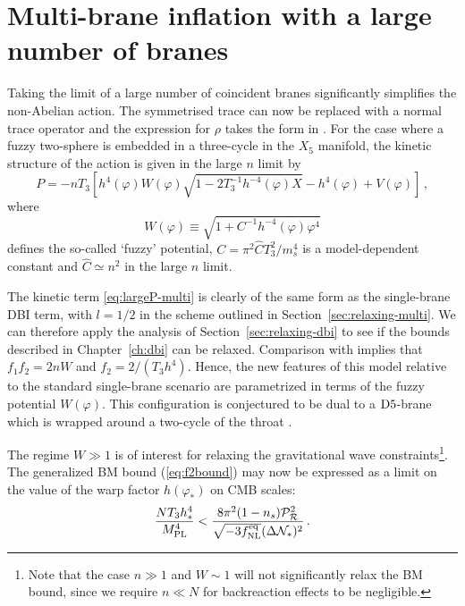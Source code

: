\section{Multi-brane inflation with a large number of branes}
\label{sec:twlargen-multi}
Taking the limit of a large number of coincident branes significantly
simplifies the non-Abelian action. The symmetrised trace can
now be replaced with a normal trace operator and the expression for $\rho$
takes the form in . 
% 
 For the case where a fuzzy two-sphere is 
embedded in a three-cycle in the $X_5$ manifold, 
the kinetic structure of the action is given in the large $n$ limit by 
\cite{thomasward}
% 
\begin{equation}
\label{eq:largeP-multi}
P=-nT_3 \left[ h^4(\varphi ) W(\varphi ) 
\sqrt{1-2 T_3^{-1} h^{-4}(\varphi) X}
-h^4(\varphi ) + V (\varphi ) \right] \,,
\end{equation}
% 
where
%    
\begin{equation} 
\label{eq:defW}
W (\varphi ) \equiv \sqrt{1+ C^{-1}h^{-4}(\varphi ) \varphi^4}
\end{equation}
% 
defines the so-called `fuzzy' potential, 
$C = \pi^2 \hat{C}T_3^2/m_s^4$ is a model-dependent constant and 
$\hat{C} \simeq n^2$ in the large $n$ limit. 

The kinetic term \eqref{eq:largeP-multi} is clearly of the same form as the
single-brane DBI term, with $l=1/2$ in the scheme outlined in
Section~\ref{sec:relaxing-multi}. We can therefore apply the analysis of
Section~\ref{sec:relaxing-dbi} to see if the bounds described in
Chapter~\ref{ch:dbi} can be relaxed.
Comparison with  
implies that $f_1f_2 =2nW$ and $f_2=2/(T_3h^4)$. Hence, 
the new features of this model relative to the standard single-brane 
scenario are parametrized in terms of the fuzzy potential $W (\varphi )$. 
This configuration is conjectured to be dual to 
a ${\rm D5}$-brane which is wrapped around a two-cycle 
of the throat \cite{dual1,dual2,dual3}. 


The regime $W \gg 1$ is of interest for 
relaxing the gravitational wave constraints\footnote{Note that 
the case $n \gg 1$ and
$W \sim 1$ will not significantly relax the BM bound, 
since we require $n \ll N$ for backreaction effects to be negligible.}. 
The generalized BM bound (\ref{eq:f2bound}) may now be expressed as 
a limit on the value of the warp factor $h(\varphi_*)$ on CMB scales: 
% 
\begin{equation}
\label{eq:warptorelax}
\frac{NT_3h^4_*}{M_{\mathrm{PL}}^4} < 
\frac{8\pi^2 (1-n_s)\mathcal{P}_{\mathcal{R}}^2 }{\sqrt{-3f_{\mathrm{NL}}^{\mathrm{eq}}}(\Delta \mathcal{N}_*)^2} \,.
\end{equation}
% 


